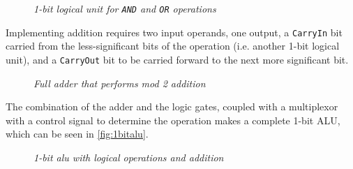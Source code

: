 \documentclass[11pt]{article}
\begin{document}
\begin{figure}[htbp]
    \centering
    \caption{\textit{1-bit logical unit for \texttt{AND} and \texttt{OR} operations}}
\end{figure}

Implementing addition requires two input operands, one output, a \texttt{CarryIn} bit carried from the less-significant bits of the operation (i.e. another 1-bit logical unit), and a \texttt{CarryOut} bit to be carried forward to the next more significant bit.

\begin{figure}[htbp]
    \centering
    \caption{\textit{Full adder that performs mod 2 addition}}
\end{figure}

The combination of the adder and the logic gates, coupled with a multiplexor with a control signal to determine the operation makes a complete 1-bit ALU, which can be seen in \autoref{fig:1bitalu}.
\pagebreak

\begin{figure}[htbp]
    \centering
    \caption{\textit{1-bit alu with logical operations and addition}}
    \label{fig:1bitalu}
\end{figure}
\end{document}
